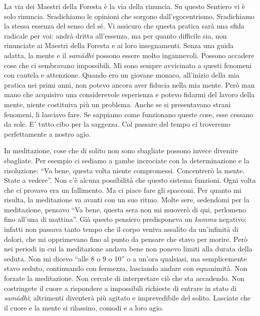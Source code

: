 La via dei Maestri della Foresta è la via della rinuncia. Su questo
Sentiero vi è solo rinuncia. Sradichiamo le opinioni che sorgono
dall'egocentrismo. Sradichiamo la stessa essenza del senso del sé. Vi
assicuro che questa pratica sarà una sfida radicale per voi: andrà
dritta all'essenza, ma per quanto difficile sia, non rinunciate ai
Maestri della Foresta e ai loro insegnamenti. Senza una guida adatta, la
mente e il \emph{samādhi} possono essere molto ingannevoli. Possono accadere
cose che ci sembravano impossibili. Mi sono sempre avvicinato a questi
fenomeni con cautela e attenzione. Quando ero un giovane monaco,
all'inizio della mia pratica nei primi anni, non potevo ancora aver
fiducia nella mia mente. Però man mano che acquisivo una considerevole
esperienza e potevo fidarmi del lavoro della mente, niente costituiva
più un problema. Anche se si presentavano strani fenomeni, li lasciavo
fare. Se sappiamo come funzionano queste cose, esse cessano da sole. E'
tutto cibo per la saggezza. Col passare del tempo ci troveremo
perfettamente a nostro agio.

In meditazione, cose che di solito non sono sbagliate possono invece
divenire sbagliate. Per esempio ci sediamo a gambe incrociate con la
determinazione e la risoluzione: ``Va bene, questa volta niente
compromessi. Concentrerò la mente. State a vedere''. Non c'è alcuna
possibilità che questo sistema funzioni. Ogni volta che ci provavo era
un fallimento. Ma ci piace fare gli spacconi. Per quanto mi risulta, la
meditazione va avanti con un suo ritmo. Molte sere, sedendomi per la
meditazione, pensavo ``Va bene, questa sera non mi muoverò di qui,
perlomeno fino all'una di mattina''. Già questo pensiero predisponeva un
\emph{kamma} negativo; infatti non passava tanto tempo che il corpo veniva
assalito da un'infinità di dolori, che mi opprimevano fino al punto da
pensare che stavo per morire. Però nei periodi in cui la meditazione
andava bene non ponevo limiti alla durata della seduta. Non mi dicevo
``alle 8 o 9 o 10'' o a un'ora qualsiasi, ma semplicemente stavo seduto,
continuando con fermezza, lasciando andare con equanimità. Non forzate
la meditazione. Non cercate di interpretare ciò che sta accadendo. Non
costringete il cuore a rispondere a impossibili richieste di entrare in
stato di \emph{samādhi}; altrimenti diventerà più agitato e imprevedibile del
solito. Lasciate che il cuore e la mente si rilassino, comodi e a loro
agio.

